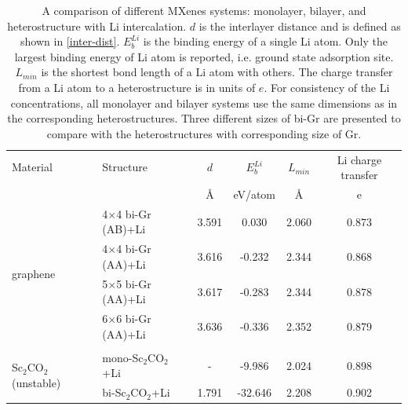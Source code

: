 \begin{table}[htbp]
{\footnotesize
\centering
\caption{A comparison of different MXenes systems: monolayer, bilayer, and heterostructure with Li intercalation. $d$ is the interlayer distance and is defined as shown in \autoref{inter-dist}. $E_b^{Li}$ is the binding energy of a single Li atom. Only the largest binding energy of Li atom is reported, i.e. ground state adsorption site. $L_{min}$ is the shortest bond length of a Li atom with others. The charge transfer from a Li atom to a heterostructure is in units of $e$. For consistency of the Li concentrations, all monolayer and bilayer systems use the same dimensions as in the corresponding heterostructures. Three different sizes of bi-Gr are presented to compare with the heterostructures with corresponding size of Gr.}  
\label{my-label}
\begin{tabularx}{\textwidth}{llcccc}
\hline
Material      & Structure                         & $d$                & $E_b^{Li}$               & $L_{min}$ & Li charge transfer   \\
              &                                   & \AA                       & eV/atom                             & \AA                       & e                \\ \hline
\multirow{4}{*}{graphene}      & 4$\times$4 bi-Gr (AB)+Li                 & 3.591                    & 0.030                          & 2.060                     & 0.873                        \\
              & 4$\times$4 bi-Gr (AA)+Li                 & 3.616                                                                            & -0.232                         & 2.344                     & 0.868                        \\
              & 5$\times$5 bi-Gr (AA)+Li                  & 3.617                                                                          & -0.283                         & 2.344                     & 0.878                        \\
              & 6$\times$6 bi-Gr (AA)+Li                  & 3.636                                                                         & -0.336                         & 2.352                     & 0.879                        \\ 
& & & & \\              
\multirow{3}{*}{Sc$_2$CO$_2$ (unstable)}    & mono-Sc$_2$CO$_2$+Li  & -  & -9.986  & 2.024  & 0.898 \\
              & bi-Sc$_2$CO$_2$+Li   & 1.791              & -32.646 & 2.208  & 0.902 \\

\end{tabularx}}
\end{table}
